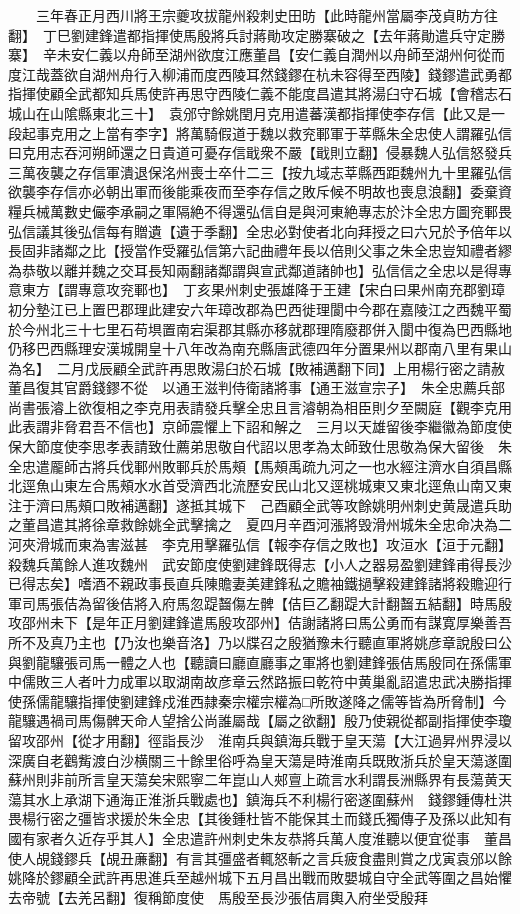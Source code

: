 　　三年春正月西川將王宗夔攻拔龍州殺刺史田昉【此時龍州當屬李茂貞眆方往翻】　丁巳劉建鋒遣都指揮使馬殷將兵討蔣勛攻定勝寨破之【去年蔣勛遣兵守定勝寨】　辛未安仁義以舟師至湖州欲度江應董昌【安仁義自潤州以舟師至湖州何從而度江哉蓋欲自湖州舟行入柳浦而度西陵耳然錢鏐在杭未容得至西陵】錢鏐遣武勇都指揮使顧全武都知兵馬使許再思守西陵仁義不能度昌遣其將湯臼守石城【會稽志石城山在山隂縣東北三十】　袁邠守餘姚閏月克用遣蕃漢都指揮使李存信【此又是一段起事克用之上當有李字】將萬騎假道于魏以救兖鄆軍于莘縣朱全忠使人謂羅弘信曰克用志吞河朔師還之日貴道可憂存信戢衆不嚴【戢則立翻】侵暴魏人弘信怒發兵三萬夜襲之存信軍潰退保洺州喪士卒什二三【按九域志莘縣西距魏州九十里羅弘信欲襲李存信亦必朝出軍而後能乘夜而至李存信之敗斥候不明故也喪息浪翻】委棄資糧兵械萬數史儼李承嗣之軍隔絶不得還弘信自是與河東絶專志於汴全忠方圖兖鄆畏弘信議其後弘信每有贈遺【遺于季翻】全忠必對使者北向拜授之曰六兄於予倍年以長固非諸鄰之比【授當作受羅弘信第六記曲禮年長以倍則父事之朱全忠豈知禮者繆為恭敬以離并魏之交耳長知兩翻諸鄰謂與宣武鄰道諸帥也】弘信信之全忠以是得專意東方【謂專意攻兖鄆也】　丁亥果州刺史張雄降于王建【宋白曰果州南充郡劉璋初分墊江已上置巴郡理此建安六年璋改郡為巴西徙理閬中今郡在嘉陵江之西魏平蜀於今州北三十七里石苟埧置南宕渠郡其縣亦移就郡理隋廢郡併入閬中復為巴西縣地仍移巴西縣理安漢城開皇十八年改為南充縣唐武德四年分置果州以郡南八里有果山為名】　二月戊辰顧全武許再思敗湯臼於石城【敗補邁翻下同】上用楊行密之請赦董昌復其官爵錢鏐不從　以通王滋判侍衛諸將事【通王滋宣宗子】　朱全忠薦兵部尚書張濬上欲復相之李克用表請發兵擊全忠且言濬朝為相臣則夕至闕庭【觀李克用此表謂非脅君吾不信也】京師震懼上下詔和解之　三月以天雄留後李繼徽為節度使　保大節度使李思孝表請致仕薦弟思敬自代詔以思孝為太師致仕思敬為保大留後　朱全忠遣龎師古將兵伐鄆州敗鄆兵於馬頰【馬頰禹疏九河之一也水經注濟水自須昌縣北逕魚山東左合馬頰水水首受濟西北流歷安民山北又逕桃城東又東北逕魚山南又東注于濟曰馬頰口敗補邁翻】遂抵其城下　己酉顧全武等攻餘姚明州刺史黄晟遣兵助之董昌遣其將徐章救餘姚全武擊擒之　夏四月辛酉河漲將毁滑州城朱全忠命决為二河夾滑城而東為害滋甚　李克用擊羅弘信【報李存信之敗也】攻洹水【洹于元翻】殺魏兵萬餘人進攻魏州　武安節度使劉建鋒既得志【小人之器易盈劉建鋒甫得長沙已得志矣】嗜酒不親政事長直兵陳贍妻美建鋒私之贍袖鐵撾擊殺建鋒諸將殺贍迎行軍司馬張佶為留後佶將入府馬忽踶齧傷左髀【佶巨乙翻踶大計翻齧五結翻】時馬殷攻邵州未下【是年正月劉建鋒遣馬殷攻邵州】佶謝諸將曰馬公勇而有謀寛厚樂善吾所不及真乃主也【乃汝也樂音洛】乃以牒召之殷猶豫未行聽直軍將姚彦章說殷曰公與劉龍驤張司馬一體之人也【聽讀曰廳直廳事之軍將也劉建鋒張佶馬殷同在孫儒軍中儒敗三人者叶力成軍以取湖南故彦章云然路振曰乾符中黄巢亂詔遣忠武决勝指揮使孫儒龍驤指揮使劉建鋒戍淮西隷秦宗權宗權為□所敗遂降之儒等皆為所脅制】今龍驤遇禍司馬傷髀天命人望捨公尚誰屬哉【屬之欲翻】殷乃使親從都副指揮使李瓊留攻邵州【從才用翻】徑詣長沙　淮南兵與鎮海兵戰于皇天蕩【大江過昇州界浸以深廣自老鸛觜渡白沙横關三十餘里俗呼為皇天蕩是時淮南兵既敗浙兵於皇天蕩遂圍蘇州則非前所言皇天蕩矣宋熙寧二年崑山人郟亶上疏言水利謂長洲縣界有長蕩黄天蕩其水上承湖下通海正淮浙兵戰處也】鎮海兵不利楊行密遂圍蘇州　錢鏐鍾傳杜洪畏楊行密之彊皆求援於朱全忠【其後鍾杜皆不能保其土而錢氏獨傳子及孫以此知有國有家者久近存乎其人】全忠遣許州刺史朱友恭將兵萬人度淮聽以便宜從事　董昌使人覘錢鏐兵【覘丑亷翻】有言其彊盛者輒怒斬之言兵疲食盡則賞之戊寅袁邠以餘姚降於鏐顧全武許再思進兵至越州城下五月昌出戰而敗嬰城自守全武等圍之昌始懼去帝號【去羌呂翻】復稱節度使　馬殷至長沙張佶肩輿入府坐受殷拜